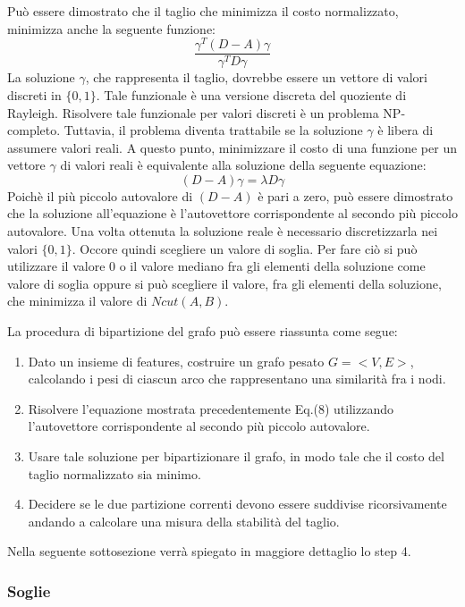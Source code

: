 Può essere dimostrato che il taglio che minimizza il costo normalizzato, minimizza anche la seguente funzione: \begin{equation}
\frac{\gamma^{T}(D-A)\gamma}{\gamma^{T}D\gamma}
\end{equation}
La soluzione $\gamma$, che rappresenta il taglio, dovrebbe essere un vettore di valori discreti in $\lbrace 0,1 \rbrace$. Tale funzionale è una versione discreta del quoziente di Rayleigh. Risolvere tale funzionale per valori discreti è un problema NP-completo. Tuttavia, il problema diventa trattabile se la soluzione $\gamma$ è libera di assumere valori reali. A questo punto, minimizzare il costo di una funzione per un vettore $\gamma$ di valori reali è equivalente alla soluzione della seguente equazione: 
\begin{equation}
(D-A) \gamma = \lambda D \gamma
\end{equation}
Poichè il più piccolo autovalore di $(D-A)$ è pari a zero, può essere dimostrato che la soluzione all'equazione è l'autovettore corrispondente al secondo più piccolo autovalore.
Una volta ottenuta la soluzione reale è necessario discretizzarla nei valori $\lbrace 0,1 \rbrace$. Occore quindi scegliere un valore di soglia. Per fare ciò si può utilizzare il valore 0 o il valore mediano fra gli elementi della soluzione come valore di soglia oppure si può scegliere il valore, fra gli elementi della soluzione, che minimizza il valore di $Ncut(A,B)$.

La procedura di bipartizione del grafo può essere riassunta come segue:
\begin{enumerate}
\item Dato un insieme di features, costruire un grafo pesato $G = <V,E>$, calcolando i pesi di ciascun arco che rappresentano una similarità fra i nodi.
\item Risolvere l'equazione mostrata precedentemente Eq.(8) utilizzando l'autovettore corrispondente al secondo più piccolo autovalore.
\item Usare tale soluzione per bipartizionare il grafo, in modo tale che il costo del taglio normalizzato sia minimo.
\item Decidere se le due partizione correnti devono essere suddivise ricorsivamente andando a calcolare una misura della stabilità del taglio.
\end{enumerate}

Nella seguente sottosezione verrà spiegato in maggiore dettaglio lo step 4.

\subsubsection{Soglie}

